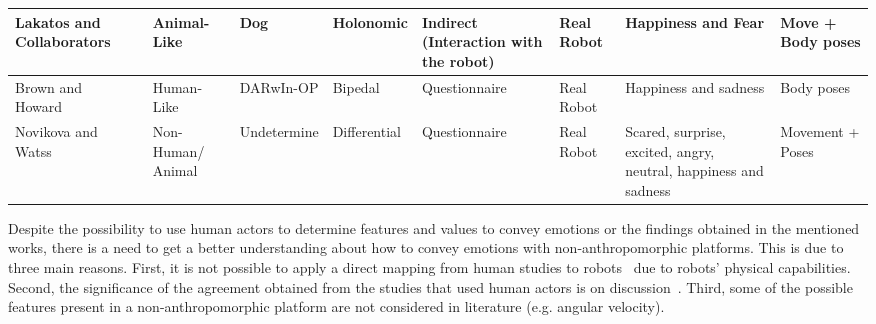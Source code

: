 \begin{table}[h]
\begin{center}
\begin{tabular}{|p{2.3 cm}|p{1.5 cm}|p{1.3 cm}|p{1.4 cm}|p{1.4 cm}|p{1.0 cm}|p{2.2 cm}|p{1.4 cm}|}
\hline
Lakatos and Collaborators~\cite{Lakatos2014}& Animal-Like & Dog & Holonomic & Indirect (Interaction with the robot) & Real Robot & Happiness and Fear &  Move + Body poses \\
\hline
Brown and Howard~\cite{Brown2014}& Human-Like & DARwIn-OP & Bipedal & Questionnaire & Real Robot & Happiness and sadness & Body poses\\
\hline
Novikova and Watss~\cite{Novika2015}&Non-Human/ Animal & Undetermine & Differential& Questionnaire& Real Robot & Scared, surprise, excited, angry, neutral, happiness and sadness &  Movement + Poses\\
\hline 
\end{tabular} 
\end{center}
\end{table}

Despite the possibility to use human actors to determine features and values to convey emotions or the findings obtained in the mentioned works, there is a need to get a better understanding about how to convey emotions with non-anthropomorphic platforms. This is due to three main reasons. First, it is not possible to apply a direct mapping from human studies to robots~\cite{Saerbeck2007,Canamero2010} due to robots' physical capabilities. Second, the significance of the agreement obtained from the studies that used human actors is on discussion~\cite{Russell2003}. Third, some of the possible features present in a non-anthropomorphic platform are not considered in literature (e.g. angular velocity). 